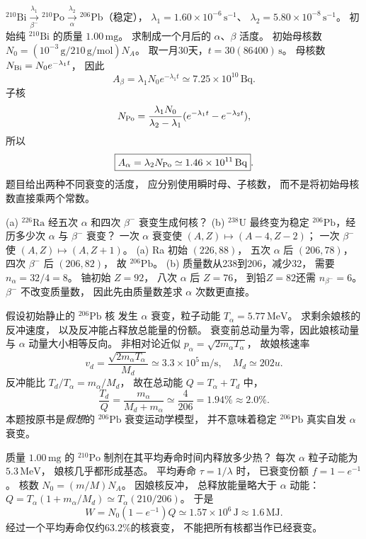 $\mathrm{^{210}Bi}\xrightarrow[\beta^-]{\lambda_1}
\mathrm{^{210}Po}\xrightarrow[\alpha]{\lambda_2}
\mathrm{^{206}Pb}$（稳定），
$\lambda_1=1.60\times10^{-6}\,\mathrm{s^{-1}}$、
$\lambda_2=5.80\times10^{-8}\,\mathrm{s^{-1}}$。
初始纯 $\mathrm{^{210}Bi}$ 的质量 $1.00\,\mathrm{mg}$。
求制成一个月后的 $\alpha$、$\beta$ 活度。
\exsolution
初始母核数
$N_0=(10^{-3}\,\mathrm g/210\,\mathrm{g/mol})N_A$。
取一月30天，$t=30(86400)\,\mathrm s$。
母核数 $N_{\rm Bi}=N_0e^{-\lambda_1t}$，
因此
\[
 \boxed{A_\beta=\lambda_1N_0e^{-\lambda_1t}
 \simeq7.25\times10^{10}\,\mathrm{Bq}}.
\]
子核
\[
 N_{\rm Po}=
 \frac{\lambda_1N_0}{\lambda_2-\lambda_1}
 (e^{-\lambda_1t}-e^{-\lambda_2t}),
\]
所以
\[
 \boxed{A_\alpha=\lambda_2 N_{\rm Po}
 \simeq1.46\times10^{11}\,\mathrm{Bq}}.
\]
\excheck 题目给出两种不同衰变的活度，
应分别使用瞬时母、子核数，
而不是将初始母核数直接乘两个常数。

(a) $\mathrm{^{226}Ra}$ 经五次 $\alpha$
和四次 $\beta^-$ 衰变生成何核？
(b) $\mathrm{^{238}U}$ 最终变为稳定
$\mathrm{^{206}Pb}$，经历多少次 $\alpha$
与 $\beta^-$ 衰变？
\exsolution
一次 $\alpha$ 衰变使
$(A,Z)\mapsto(A-4,Z-2)$；
一次 $\beta^-$ 使
$(A,Z)\mapsto(A,Z+1)$。
(a) Ra 初始 $(226,88)$，
五次 $\alpha$ 后 $(206,78)$，
四次 $\beta^-$ 后 $(206,82)$，
故 $\boxed{\mathrm{^{206}Pb}}$。
(b) 质量数从238到206，减少32，
需要 $\boxed{n_\alpha=32/4=8}$。
铀初始 $Z=92$，
八次 $\alpha$ 后 $Z=76$，
到铅$Z=82$还需
$\boxed{n_{\beta^-}=6}$。
\excheck $\beta^-$ 不改变质量数，
因此先由质量数差求 $\alpha$ 次数更直接。

假设初始静止的 $\mathrm{^{206}Pb}$ 核
发生 $\alpha$ 衰变，粒子动能
$T_\alpha=5.77\,\mathrm{MeV}$。
求剩余娘核的反冲速度，
以及反冲能占释放总能量的份额。
\exsolution
衰变前总动量为零，因此娘核动量与 $\alpha$
动量大小相等反向。
非相对论近似
$p_\alpha=\sqrt{2m_\alpha T_\alpha}$，
故娘核速率
\[
 \boxed{v_d=\frac{\sqrt{2m_\alpha T_\alpha}}{M_d}
 \simeq3.3\times10^5\,\mathrm{m/s}},
 \quad M_d\simeq202u.
\]
反冲能比
$T_d/T_\alpha=m_\alpha/M_d$，
故在总动能
$Q=T_\alpha+T_d$ 中，
\[
 \boxed{\frac{T_d}{Q}
 =\frac{m_\alpha}{M_d+m_\alpha}
 \simeq\frac4{206}=1.94\%\approx2.0\%}.
\]
\excheck 本题按原书是\emph{假想}的
$\mathrm{^{206}Pb}$ 衰变运动学模型，
并不意味着稳定 $\mathrm{^{206}Pb}$ 真实自发 $\alpha$ 衰变。

质量 $1.00\,\mathrm{mg}$ 的 $\mathrm{^{210}Po}$
制剂在其平均寿命时间内释放多少热？
每次 $\alpha$ 粒子动能为 $5.3\,\mathrm{MeV}$，
娘核几乎都形成基态。
\exsolution
平均寿命 $\tau=1/\lambda$ 时，
已衰变份额
$f=1-e^{-1}$。
核数
$N_0=(m/M)N_A$。
因娘核反冲，
总释放能量略大于 $\alpha$ 动能：
$Q=T_\alpha(1+m_\alpha/M_d)
\simeq T_\alpha(210/206)$。
于是
\[
 \boxed{W=N_0(1-e^{-1})Q
 \simeq1.57\times10^6\,\mathrm J
 \approx1.6\,\mathrm{MJ}}.
\]
\excheck 经过一个平均寿命仅约63.2\%的核衰变，
不能把所有核都当作已经衰变。

